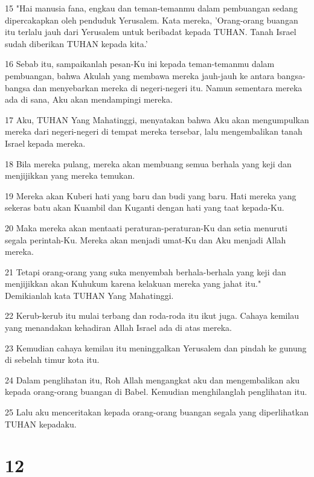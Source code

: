 \par 15 "Hai manusia fana, engkau dan teman-temanmu dalam pembuangan sedang dipercakapkan oleh penduduk Yerusalem. Kata mereka, 'Orang-orang buangan itu terlalu jauh dari Yerusalem untuk beribadat kepada TUHAN. Tanah Israel sudah diberikan TUHAN kepada kita.'
\par 16 Sebab itu, sampaikanlah pesan-Ku ini kepada teman-temanmu dalam pembuangan, bahwa Akulah yang membawa mereka jauh-jauh ke antara bangsa-bangsa dan menyebarkan mereka di negeri-negeri itu. Namun sementara mereka ada di sana, Aku akan mendampingi mereka.
\par 17 Aku, TUHAN Yang Mahatinggi, menyatakan bahwa Aku akan mengumpulkan mereka dari negeri-negeri di tempat mereka tersebar, lalu mengembalikan tanah Israel kepada mereka.
\par 18 Bila mereka pulang, mereka akan membuang semua berhala yang keji dan menjijikkan yang mereka temukan.
\par 19 Mereka akan Kuberi hati yang baru dan budi yang baru. Hati mereka yang sekeras batu akan Kuambil dan Kuganti dengan hati yang taat kepada-Ku.
\par 20 Maka mereka akan mentaati peraturan-peraturan-Ku dan setia menuruti segala perintah-Ku. Mereka akan menjadi umat-Ku dan Aku menjadi Allah mereka.
\par 21 Tetapi orang-orang yang suka menyembah berhala-berhala yang keji dan menjijikkan akan Kuhukum karena kelakuan mereka yang jahat itu." Demikianlah kata TUHAN Yang Mahatinggi.
\par 22 Kerub-kerub itu mulai terbang dan roda-roda itu ikut juga. Cahaya kemilau yang menandakan kehadiran Allah Israel ada di atas mereka.
\par 23 Kemudian cahaya kemilau itu meninggalkan Yerusalem dan pindah ke gunung di sebelah timur kota itu.
\par 24 Dalam penglihatan itu, Roh Allah mengangkat aku dan mengembalikan aku kepada orang-orang buangan di Babel. Kemudian menghilanglah penglihatan itu.
\par 25 Lalu aku menceritakan kepada orang-orang buangan segala yang diperlihatkan TUHAN kepadaku.

\chapter{12}

